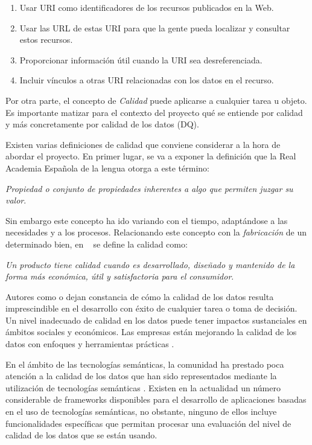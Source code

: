 \begin{enumerate}
\item{Usar \acs{URI} como identificadores de los recursos publicados en la Web.}
\item{Usar las URL de estas \acs{URI} para que la gente pueda localizar y consultar
  estos recursos.}
\item{Proporcionar información útil cuando la \acs{URI} sea desreferenciada.}
\item{Incluir vínculos a otras \acs{URI} relacionadas con los datos en el recurso.}
\end{enumerate}


Por otra parte, el concepto de \textit{Calidad} puede aplicarse a cualquier tarea u objeto. Es
importante matizar para el contexto del proyecto qué se entiende por calidad y
más concretamente por calidad de los datos (\acs{DQ}). 


Existen varias definiciones de calidad que conviene considerar a la hora de
abordar el proyecto. En primer lugar, se va a exponer la definición que la Real
Academia Española de la lengua otorga a este término: 

\textit{Propiedad o conjunto de propiedades
  inherentes a algo que permiten juzgar su valor}.

Sin embargo este concepto ha ido variando con el tiempo, adaptándose a las
necesidades y a los procesos. Relacionando este concepto con la
\textit{fabricación} de un determinado bien, en ~\cite{ISHI} se define la calidad
como: 

\textit{Un producto tiene calidad cuando es desarrollado, diseñado y mantenido
  de la forma más económica, útil y satisfactoria para el consumidor}. 


Autores como \cite{conf/webist/CaballeroMACC} o \cite{conf/ekaw/FurberH10} dejan constancia de cómo la calidad de los datos resulta imprescindible en el
desarrollo con éxito de cualquier tarea o toma de decisión. Un nivel inadecuado de calidad en los datos puede tener impactos sustanciales en ámbitos
sociales y económicos. Las empresas están mejorando la calidad de los datos con
enfoques y herramientas prácticas \cite{Wang:1996:BAD:1189570.1189572}. 

En el ámbito de las tecnologías semánticas, la comunidad ha prestado poca
atención a la calidad de los datos que han sido representados mediante la
utilización de tecnologías semánticas
\cite{conf/ekaw/FurberH10}. Existen en la actualidad un número considerable de
frameworks disponibles para el desarrollo de aplicaciones basadas en el uso de
tecnologías semánticas, no obstante, ninguno de ellos incluye funcionalidades
específicas que permitan procesar una evaluación del nivel de calidad de los
datos que se están usando.

